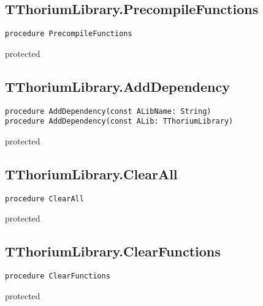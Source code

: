 \subsection{TThoriumLibrary.PrecompileFunctions}
\label{thoriumcore:thorium:tthoriumlibrary:precompilefunctions}
\begin{FPCList}
\Synopsis
\Declaration 

\begin{verbatim}
procedure PrecompileFunctions
\end{verbatim}
\Visibility
protected
\Description
\Errors
\end{FPCList}
\subsection{TThoriumLibrary.AddDependency}
\label{thoriumcore:thorium:tthoriumlibrary:adddependency}
\begin{FPCList}
\Synopsis
\Declaration 

\begin{verbatim}
procedure AddDependency(const ALibName: String)
procedure AddDependency(const ALib: TThoriumLibrary)
\end{verbatim}
\Visibility
protected
\Description
\Errors
\end{FPCList}
\subsection{TThoriumLibrary.ClearAll}
\label{thoriumcore:thorium:tthoriumlibrary:clearall}
\begin{FPCList}
\Synopsis
\Declaration 

\begin{verbatim}
procedure ClearAll
\end{verbatim}
\Visibility
protected
\Description
\Errors
\end{FPCList}
\subsection{TThoriumLibrary.ClearFunctions}
\label{thoriumcore:thorium:tthoriumlibrary:clearfunctions}
\begin{FPCList}
\Synopsis
\Declaration 

\begin{verbatim}
procedure ClearFunctions
\end{verbatim}
\Visibility
protected
\Description
\Errors
\end{FPCList}
